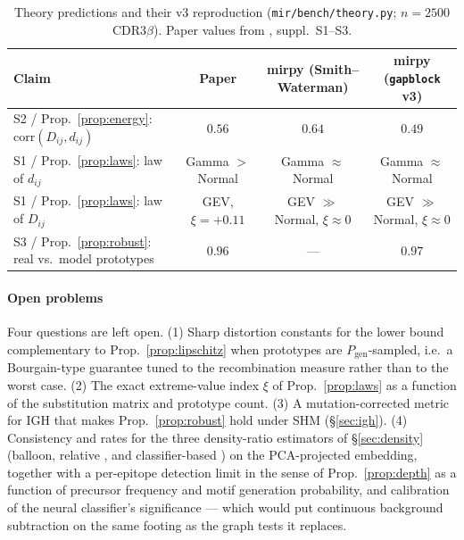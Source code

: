 \documentclass[11pt]{article}
\theoremstyle{oldplain}
\theoremstyle{oldrem}
\newcommand{\Pgen}{P_{\mathrm{gen}}}
\newcommand{\code}[1]{\texttt{#1}}
\begin{document}
\begin{table}[h]
  \centering
  \caption{Theory predictions and their v3 reproduction (\code{mir/bench/theory.py}; $n=2500$
  CDR3$\beta$). Paper values from \cite{Kremlyakova2025}, suppl.\ S1--S3.}
  \label{tab:reproduced}
  {\footnotesize
  \begin{tabular}{lccc}
    \toprule
    Claim & Paper & mirpy (Smith--Waterman) & mirpy (\code{gapblock} v3)\\
    \midrule
    S2 / Prop.~\ref{prop:energy}: $\mathrm{corr}(D_{ij},d_{ij})$ & $0.56$ & $0.64$ & $0.49$ \\
    S1 / Prop.~\ref{prop:laws}: law of $d_{ij}$ & Gamma $>$ Normal & Gamma $\approx$ Normal & Gamma $\approx$ Normal \\
    S1 / Prop.~\ref{prop:laws}: law of $D_{ij}$ & GEV, $\xi{=}{+}0.11$ & GEV $\gg$ Normal, $\xi{\approx}0$ & GEV $\gg$ Normal, $\xi{\approx}0$ \\
    S3 / Prop.~\ref{prop:robust}: real vs.\ model prototypes & $0.96$ & --- & $0.97$ \\
    \bottomrule
  \end{tabular}}
\end{table}

\paragraph{Open problems} Four questions are left open. (1) Sharp distortion constants for the lower
bound complementary to Prop.~\ref{prop:lipschitz} when prototypes are $\Pgen$-sampled, i.e.\ a
Bourgain-type \cite{Bourgain1985} guarantee tuned to the recombination measure rather than to the worst
case. (2) The exact extreme-value index $\xi$ of Prop.~\ref{prop:laws} as a function of the substitution
matrix and prototype count. (3) A mutation-corrected metric for {\scshape IGH} that makes
Prop.~\ref{prop:robust} hold under {\scshape SHM} (\S\ref{sec:igh}). (4) Consistency and rates for the three
density-ratio estimators of \S\ref{sec:density} (balloon, relative \cite{Yamada2013}, and classifier-based
\cite{GutmannHyvarinen2012}) on the {\scshape PCA}-projected embedding, together with a per-epitope detection
limit in the sense of Prop.~\ref{prop:depth} as a function of precursor frequency and motif generation
probability, and calibration of the neural classifier's significance --- which would put continuous
background subtraction on the same footing as the graph tests it replaces.



\end{document}
